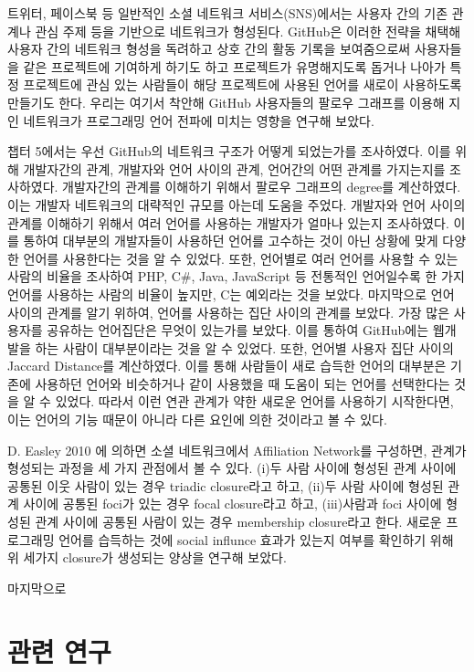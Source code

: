 \documentclass[10pt, a4paper, titlepage]{article}
\begin{document}
트위터, 페이스북 등 일반적인 소셜 네트워크 서비스(SNS)에서는 사용자 간의 기존 관계나 관심 주제 등을 기반으로 네트워크가 형성된다. GitHub은 이러한 전략을 채택해 사용자 간의 네트워크 형성을 독려하고 상호 간의 활동 기록을 보여줌으로써 사용자들을 같은 프로젝트에 기여하게 하기도 하고 프로젝트가 유명해지도록 돕거나 나아가 특정 프로젝트에 관심 있는 사람들이 해당 프로젝트에 사용된 언어를 새로이 사용하도록 만들기도 한다. 우리는 여기서 착안해 GitHub 사용자들의 팔로우 그래프를 이용해 지인 네트워크가 프로그래밍 언어 전파에 미치는 영향을 연구해 보았다.

챕터 5에서는 우선 GitHub의 네트워크 구조가 어떻게 되었는가를 조사하였다. 이를 위해 개발자간의 관계, 개발자와 언어 사이의 관계, 언어간의 어떤 관계를 가지는지를 조사하였다. 개발자간의 관계를 이해하기 위해서 팔로우 그래프의 degree를 계산하였다. 이는 개발자 네트워크의 대략적인 규모를 아는데 도움을 주었다. 개발자와 언어 사이의 관계를 이해하기 위해서 여러 언어를 사용하는 개발자가 얼마나 있는지 조사하였다. 이를 통하여 대부분의 개발자들이 사용하던 언어를 고수하는 것이 아닌 상황에 맞게 다양한 언어를 사용한다는 것을 알 수 있었다. 또한, 언어별로 여러 언어를 사용할 수 있는 사람의 비율을 조사하여 PHP, C\#, Java, JavaScript 등 전통적인 언어일수록 한 가지 언어를 사용하는 사람의 비율이 높지만, C는 예외라는 것을 보았다. 마지막으로 언어 사이의 관계를 알기 위하여, 언어를 사용하는 집단 사이의 관계를 보았다. 가장 많은 사용자를 공유하는 언어집단은 무엇이 있는가를 보았다. 이를 통하여 GitHub에는 웹개발을 하는 사람이 대부분이라는 것을 알 수 있었다. 또한, 언어별 사용자 집단 사이의 Jaccard Distance를 계산하였다. 이를 통해 사람들이 새로 습득한 언어의 대부분은 기존에 사용하던 언어와 비슷하거나 같이 사용했을 때 도움이 되는 언어를 선택한다는 것을 알 수 있었다. 따라서 이런 연관 관계가 약한 새로운 언어를 사용하기 시작한다면, 이는 언어의 기능 때문이 아니라 다른 요인에 의한 것이라고 볼 수 있다.

D. Easley  2010 \cite{r2}에 의하면 소셜 네트워크에서 Affiliation Network를 구성하면, 관계가 형성되는 과정을 세 가지 관점에서 볼 수 있다. (i)두 사람 사이에 형성된 관계 사이에 공통된 이웃 사람이 있는 경우 triadic closure라고 하고, (ii)두 사람 사이에 형성된 관계 사이에 공통된 foci가 있는 경우 focal closure라고 하고, (iii)사람과 foci 사이에 형성된 관계 사이에 공통된 사람이 있는 경우 membership closure라고 한다. 새로운 프로그래밍 언어를 습득하는 것에 social influnce 효과가 있는지 여부를 확인하기 위해 위 세가지 closure가 생성되는 양상을 연구해 보았다.

마지막으로

\section{관련 연구}
\end{document}
